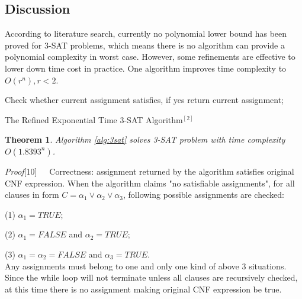 \documentclass[11pt,twoside, onecolumn]{IEEEtran}
\newtheorem{Theorem}{Theorem}[section]
\begin{document}
\subsection{Discussion}
According to literature search, currently no polynomial lower bound has been proved for 3-SAT problems,
which means there is no algorithm can provide a polynomial complexity in worst case.
However, some refinements are effective to lower down time cost in practice.
One algorithm improves time complexity to $O(r^n), r < 2$.
\begin{algorithm}[hbt]
\SetAlgoNoLine
  Check whether current assignment satisfies, if yes return current assignment;\\
 {
 }
 	 \caption{The Refined Exponential Time 3-SAT Algorithm$^{[2]}$}\label{alg:3sat}
\end{algorithm}
\begin{Theorem}
Algorithm \ref{alg:3sat} solves 3-SAT problem with time complexity $O(1.8393^n)$.
\end{Theorem}

\textit{Proof}[10]\ \ \ Correctness: assignment returned by the algorithm satisfies original CNF expression.
When the algorithm claims "no satisfiable assignments", for all clauses in form
$C = \alpha_1 \lor \alpha_2 \lor \alpha_3$, following possible assignments are checked:\par
(1) $\alpha_1 = TRUE$;\par
(2) $\alpha_1 = FALSE$ and $\alpha_2 = TRUE$;\par
(3) $\alpha_1 = \alpha_2 = FALSE$ and $\alpha_3 = TRUE$.\\
Any assignments must belong to one and only one kind of above 3 situations. Since the while loop
will not terminate unless all clauses are recursively checked, at this time there is no assignment
making original CNF expression be true. 
\end{document}
